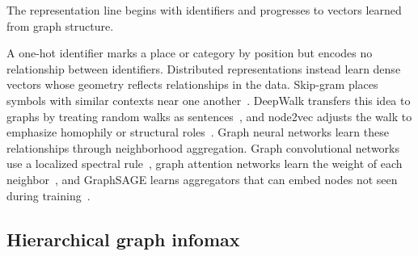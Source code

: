 The representation line begins with identifiers and progresses to vectors learned
from graph structure.

A one-hot identifier marks a place or category by position but encodes no relationship
between identifiers. Distributed representations instead learn dense vectors whose
geometry reflects relationships in the data. Skip-gram places symbols with similar
contexts near one another~\cite{mikolov2013word2vec}. DeepWalk transfers this idea to
graphs by treating random walks as sentences~\cite{perozzi2014deepwalk}, and node2vec
adjusts the walk to emphasize homophily or structural
roles~\cite{grover2016node2vec}. Graph neural networks learn these relationships
through neighborhood aggregation. Graph convolutional networks use a localized
spectral rule~\cite{kipf2017gcn}, graph attention networks learn the weight of each
neighbor~\cite{velivckovic2017graph}, and GraphSAGE learns aggregators that can embed
nodes not seen during training~\cite{hamilton2017graphsage}.

\subsection{Hierarchical graph infomax}

